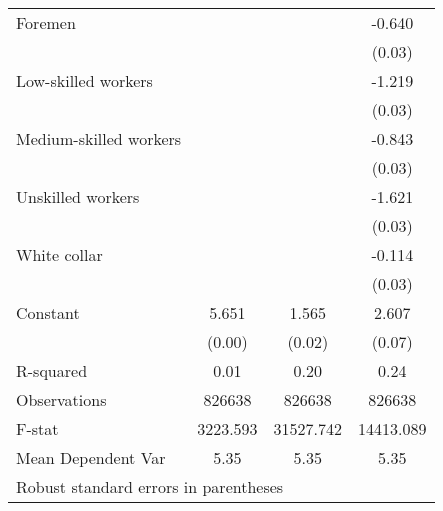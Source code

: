 {\begin{tabular}{l*{3}{c}}
Foremen             &                     &                     &      -0.640\sym{***}\\
                    &                     &                     &      (0.03)         \\
Low-skilled workers &                     &                     &      -1.219\sym{***}\\
                    &                     &                     &      (0.03)         \\
Medium-skilled workers&                     &                     &      -0.843\sym{***}\\
                    &                     &                     &      (0.03)         \\
Unskilled workers   &                     &                     &      -1.621\sym{***}\\
                    &                     &                     &      (0.03)         \\
White collar        &                     &                     &      -0.114\sym{***}\\
                    &                     &                     &      (0.03)         \\
Constant            &       5.651\sym{***}&       1.565\sym{***}&       2.607\sym{***}\\
                    &      (0.00)         &      (0.02)         &      (0.07)         \\
\hline
R-squared           &        0.01         &        0.20         &        0.24         \\
Observations        &      826638         &      826638         &      826638         \\
F-stat              &    3223.593         &   31527.742         &   14413.089         \\
Mean Dependent Var  &        5.35         &        5.35         &        5.35         \\
\hline\hline
\multicolumn{4}{l}{\footnotesize Robust standard errors in parentheses}\\
\end{tabular}
}
